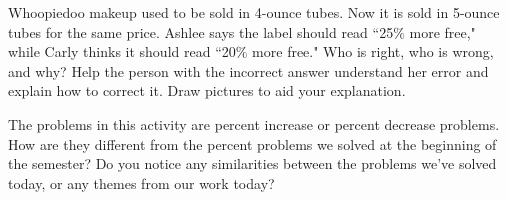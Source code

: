 \documentclass[noauthor,nooutcomes]{ximera}
\begin{document}
\begin{problem}
 Whoopiedoo makeup used to be sold in 4-ounce tubes.  Now it is sold in 5-ounce tubes for the same price.  Ashlee says the label should read ``25$\%$ more free," while Carly thinks it should read ``20$\%$ more free."  Who is right, who is wrong, and why?  Help the person with the incorrect answer understand her error and explain how to correct it.   Draw pictures to aid your explanation.

\end{problem}



\begin{problem}
The problems in this activity are percent increase or percent decrease problems. How are they different from the percent problems we solved at the beginning of the semester? Do you notice any similarities between the problems we've solved today, or any themes from our work today?
\end{problem}






\newpage
\end{document}
